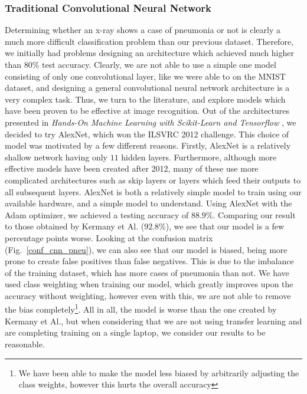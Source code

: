 \documentclass[onecolumn,10pt,cleanfoot]{asme2ej}
\begin{document}
\subsubsection{Traditional Convolutional Neural Network}

Determining whether an x-ray shows a case of pneumonia or not is clearly a much more difficult classification problem than our previous dataset. Therefore, we initially had problems designing an architecture which achieved much higher than $80\%$ test accuracy. Clearly, we are not able to use a simple one model consisting of only one convolutional layer, like we were able to on the MNIST dataset, and designing a general convolutional neural network architecture is a very complex task. Thus, we turn to the literature, and explore models which have been proven to be effective at image recognition. Out of the architectures presented in {\it Hands-On Machine Learning with Scikit-Learn and Tensorflow} \cite{geron}, we decided to try AlexNet, which won the ILSVRC 2012 challenge. This choice of model was motivated by a few different reasons. Firstly, AlexNet is a relatively shallow network having only $11$ hidden layers. Furthermore, although more effective models have been created after 2012, many of these use more complicated architectures such as skip layers or layers which feed their outputs to all subsequent layers. AlexNet is both a relatively simple model to train using our available hardware, and a simple model to understand. Using AlexNet with the Adam optimizer, we achieved a testing accuracy of $88.9\%$. Comparing our result to those obtained by Kermany et Al. ($92.8\%$), we see that our model is a few percentage points worse. Looking at the confusion matrix (Fig.~\ref{conf_cnn_pneu}), we can also see that our model is biased, being more prone to create false positives than false negatives. This is due to the imbalance of the training dataset, which has more cases of pneumonia than not. We have used class weighting when training our model, which greatly improves upon the accuracy without weighting, however even with this, we are not able to remove the bias completely\footnote{We have been able to make the model less biased by arbitrarily adjusting the class weights, however this hurts the overall accuracy}. All in all, the model is worse than the one created by Kermany et Al., but when considering that we are not using transfer learning and are completing training on a single laptop, we consider our results to be reasonable.
\end{document}
